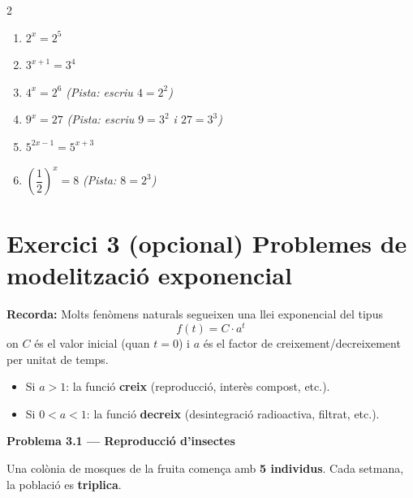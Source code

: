 \documentclass[12pt,a4paper]{article}
\begin{document}
\begin{multicols}{2}
\begin{enumerate}[label=\textbf{\alph*)}, leftmargin=1.2cm, itemsep=0.6cm]
    \item $2^x = 2^5$
    \item $3^{x+1} = 3^4$
    \item $4^x = 2^6$ \quad \textit{(Pista: escriu $4 = 2^2$)}
    \item $9^x = 27$ \quad \textit{(Pista: escriu $9=3^2$ i $27=3^3$)}
    \item $5^{2x-1} = 5^{x+3}$
    \item $\left(\dfrac{1}{2}\right)^x = 8$ \quad \textit{(Pista: $8=2^3$)}
\end{enumerate}
\end{multicols}

\newpage

\section*{Exercici 3 (opcional) \quad Problemes de modelitzaci\'o exponencial}

\begin{recordatori}
\textbf{Recorda:} Molts fen\`omens naturals segueixen una llei exponencial del tipus
\[
f(t) = C \cdot a^t
\]
on $C$ \'es el valor inicial (quan $t=0$) i $a$ \'es el factor de creixement/decreixement per unitat de temps.
\begin{itemize}[noitemsep]
    \item Si $a > 1$: la funci\'o \textbf{creix} (reproducci\'o, inter\`es compost, etc.).
    \item Si $0 < a < 1$: la funci\'o \textbf{decreix} (desintegraci\'o radioactiva, filtrat, etc.).
\end{itemize}
\end{recordatori}

\vspace{0.5cm}

\noindent\textbf{Problema 3.1 --- Reproducci\'o d'insectes}

\vspace{0.2cm}
\noindent Una col\`onia de mosques de la fruita comen\c{c}a amb \textbf{5 individus}. Cada setmana, la poblaci\'o es \textbf{triplica}.
\end{document}
